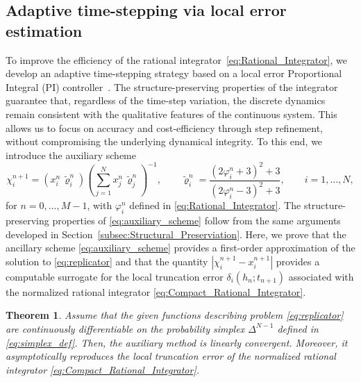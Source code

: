 \documentclass[11pt,letterpaper]{article}
\newtheorem{theorem}{Theorem}[section]
\theoremstyle{remark}
\begin{document}
\subsection{Adaptive time-stepping via local error estimation}\label{Subsec:VariableH}
To improve the efficiency of the rational integrator~\eqref{eq:Rational_Integrator}, we develop an adaptive time-stepping strategy based on a local error Proportional Integral (PI) controller~\cite{Gustafsson_1991,PI2}. The structure-preserving properties of the integrator guarantee that, regardless of the time-step variation, the discrete dynamics remain consistent with the qualitative features of the continuous system. This allows us to focus on accuracy and cost-efficiency through step refinement, without compromising the underlying dynamical integrity. To this end, we introduce the auxiliary scheme
\begin{equation}\label{eq:auxiliary_scheme}
    \chi_i^{n+1}=(x_i^n \, \tilde{\varrho}_i^n)\left(\displaystyle\sum_{j=1}^N x_j^n \, \tilde{\varrho}_j^n\right)^{-1}, \qquad \tilde{\varrho}_i^n=\dfrac{(2\varphi_i^n+3)^2+3}{(2\varphi_i^n-3)^2+3}, \qquad i=1,\dots,N,
\end{equation}
for $n=0,\dots,M-1$, with $\varphi_i^n$ defined in \eqref{eq:Rational_Integrator}. The structure-preserving properties of \eqref{eq:auxiliary_scheme} follow from the same arguments developed in Section~\ref{subsec:Structural_Preserviation}. Here, we prove that the ancillary scheme \eqref{eq:auxiliary_scheme} provides a first-order approximation of the solution to \eqref{eq:replicator} and that the quantity $|\chi_i^{n+1}-x_i^{n+1}|$ provides a computable surrogate for the local truncation error $\delta_i(h_n;t_{n+1})$ associated with the normalized rational integrator \eqref{eq:Compact_Rational_Integrator}. 
\begin{theorem}\label{thm:local_Estimate_Controller}
    Assume that the given functions describing problem \eqref{eq:replicator} are continuously differentiable on the probability simplex $\Delta^{N-1}$ defined in \eqref{eq:simplex_def}. Then, the auxiliary method is linearly convergent. Moreover, it asymptotically reproduces the local truncation error of the normalized rational integrator \eqref{eq:Compact_Rational_Integrator}.
\end{theorem}
\end{document}
